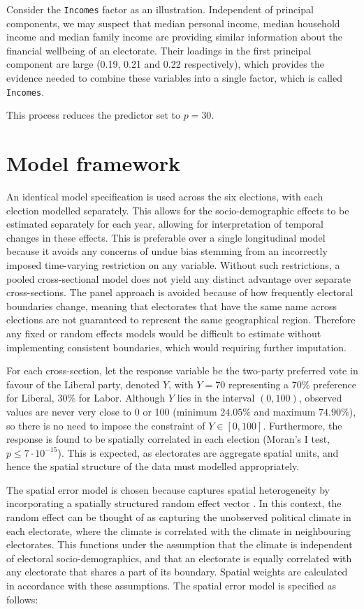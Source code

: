 \documentclass[openany]{book}
\begin{document}
Consider the \texttt{Incomes} factor as an illustration. Independent of principal components, we may suspect that median personal income, median household income and median family income are providing similar information about the financial wellbeing of an electorate. Their loadings in the first principal component are large (0.19, 0.21 and 0.22 respectively), which provides the evidence needed to combine these variables into a single factor, which is called \texttt{Incomes}.

This process reduces the predictor set to \(p = 30\).

\hypertarget{model-framework}{%
\section{Model framework}\label{model-framework}}

An identical model specification is used across the six elections, with each election modelled separately. This allows for the socio-demographic effects to be estimated separately for each year, allowing for interpretation of temporal changes in these effects. This is preferable over a single longitudinal model because it avoids any concerns of undue bias stemming from an incorrectly imposed time-varying restriction on any variable. Without such restrictions, a pooled cross-sectional model does not yield any distinct advantage over separate cross-sections. The panel approach is avoided because of how frequently electoral boundaries change, meaning that electorates that have the same name across elections are not guaranteed to represent the same geographical region. Therefore any fixed or random effects models would be difficult to estimate without implementing consistent boundaries, which would requiring further imputation.

For each cross-section, let the response variable be the two-party preferred vote in favour of the Liberal party, denoted \(Y\), with \(Y = 70\) representing a 70\% preference for Liberal, 30\% for Labor. Although \(Y\) lies in the interval \((0,100)\), observed values are never very close to 0 or 100 (minimum \(24.05 \%\) and maximum \(74.90 \%\)), so there is no need to impose the constraint of \(Y \in [0,100]\). Furthermore, the response is found to be spatially correlated in each election (Moran's I test, \(p \le 7\cdot10^{-15}\)). This is expected, as electorates are aggregate spatial units, and hence the spatial structure of the data must modelled appropriately.

The spatial error model \citep{Anselin88} is chosen because captures spatial heterogeneity by incorporating a spatially structured random effect vector \citep{LeSage2009}. In this context, the random effect can be thought of as capturing the unobserved political climate in each electorate, where the climate is correlated with the climate in neighbouring electorates. This functions under the assumption that the climate is independent of electoral socio-demographics, and that an electorate is equally correlated with any electorate that shares a part of its boundary. Spatial weights are calculated in accordance with these assumptions. The spatial error model is specified as follows:
\end{document}
